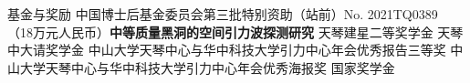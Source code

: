 \begin{rubric}{基金与奖励}
    \entry*[2021-2023] 中国博士后基金委员会第三批特别资助（站前）No. 2021TQ0389 （18万元人民币）\textbf{中等质量黑洞的空间引力波探测研究} 
%
    \entry*[2020] 天琴建星二等奖学金
    \entry*[2019] 天琴中大请奖学金
    \entry*[2019] 中山大学天琴中心与华中科技大学引力中心年会优秀报告三等奖 
    \entry*[2018] 中山大学天琴中心与华中科技大学引力中心年会优秀海报奖
    \entry*[2015] 国家奖学金
\end{rubric}
